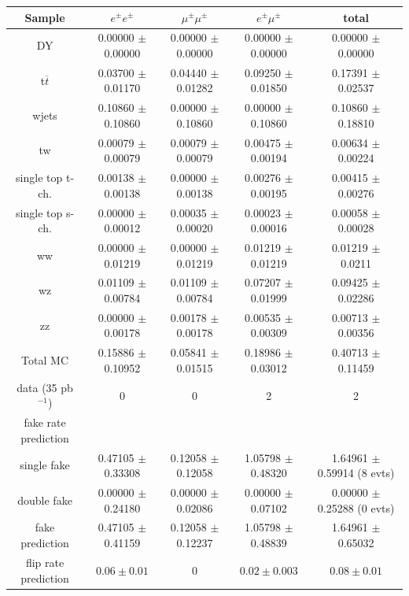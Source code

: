 \vspace{6 mm}
\begin{table}[htb]
\begin{center}
\begin{tabular}{|c|c|c|c|c|}
\hline
Sample & $e^{\pm}e^{\pm}$    & $\mu^{\pm}\mu^{\pm}$ & $e^{\pm}\mu^{\pm}$      & total \\ \hline
\hline
DY  & 0.00000 $\pm$ 0.00000 & 0.00000 $\pm$ 0.00000 & 0.00000 $\pm$ 0.00000 & 0.00000 $\pm$ 0.00000 \\ 
t$\overline{t}$  & 0.03700 $\pm$ 0.01170 & 0.04440 $\pm$ 0.01282 & 0.09250 $\pm$ 0.01850 & 0.17391 $\pm$ 0.02537 \\ 
wjets  & 0.10860 $\pm$ 0.10860 & 0.00000 $\pm$ 0.10860 & 0.00000 $\pm$ 0.10860 & 0.10860 $\pm$ 0.18810 \\ 
tw  & 0.00079 $\pm$ 0.00079 & 0.00079 $\pm$ 0.00079 & 0.00475 $\pm$ 0.00194 & 0.00634 $\pm$ 0.00224 \\ 
single top t-ch.  & 0.00138 $\pm$ 0.00138 & 0.00000 $\pm$ 0.00138 & 0.00276 $\pm$ 0.00195 & 0.00415 $\pm$ 0.00276 \\ 
single top s-ch.  & 0.00000 $\pm$ 0.00012 & 0.00035 $\pm$ 0.00020 & 0.00023 $\pm$ 0.00016 & 0.00058 $\pm$ 0.00028\\ 
ww  & 0.00000 $\pm$ 0.01219 & 0.00000 $\pm$ 0.01219 & 0.01219 $\pm$ 0.01219 & 0.01219 $\pm$ 0.0211 \\ 
wz  & 0.01109 $\pm$ 0.00784 & 0.01109 $\pm$ 0.00784 & 0.07207 $\pm$ 0.01999 & 0.09425 $\pm$ 0.02286 \\ 
zz  & 0.00000 $\pm$ 0.00178 & 0.00178 $\pm$ 0.00178 & 0.00535 $\pm$ 0.00309 & 0.00713 $\pm$ 0.00356 \\ 
\hline
Total MC  & 0.15886 $\pm$ 0.10952 & 0.05841 $\pm$ 0.01515 & 0.18986 $\pm$ 0.03012 & 0.40713 $\pm$ 0.11459 \\
\hline\hline
data  (35 pb$^{-1}$)     & 0  &  0  & 2  & 2      \\ \hline
fake rate prediction & & & & \\ \hline
single fake   & 0.47105 $\pm$ 0.33308 & 0.12058 $\pm$ 0.12058 & 1.05798 $\pm$ 0.48320 & 1.64961 $\pm$ 0.59914 (8 evts) \\
double fake   & 0.00000 $\pm$ 0.24180 & 0.00000 $\pm$ 0.02086 & 0.00000 $\pm$ 0.07102 & 0.00000 $\pm$ 0.25288 (0 evts) \\
fake prediction & 0.47105 $\pm$ 0.41159 & 0.12058 $\pm$ 0.12237 & 1.05798 $\pm$ 0.48839 & 1.64961 $\pm$ 0.65032 \\
\hline
flip rate prediction & $0.06\pm 0.01$ & 0 & $0.02\pm 0.003$ & $0.08\pm 0.01$ \\ \hline\hline

\end{tabular}
\end{center}
\end{table}
